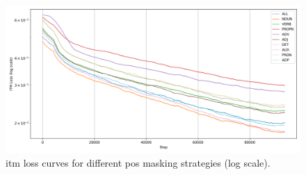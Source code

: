 \begin{figure}[H]
    \caption{\acrshort{itm} loss curves for different \acrshort{pos} masking strategies (log scale).}
    \label{fig:itm_loss_pretrain}
    \centering
    \includegraphics[width=\textwidth]{Images/graph/itm.png}
\end{figure}




